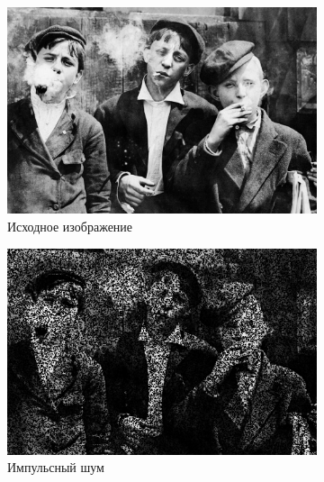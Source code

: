 \begin{figure}[ht] 
    \centering
    \begin{subfigure}[b]{0.5\linewidth}
        \centering
        \includegraphics[width=0.95\linewidth]{../lewis-hine-taschen-main-3.jpg} 
        \caption{Исходное изображение} 
        \label{rang_3_1:a} 
        \vspace{4ex}
    \end{subfigure}%
    \begin{subfigure}[b]{0.5\linewidth}
      \centering
      \includegraphics[width=0.95\linewidth]{../Rang_Filter/Rang_Impulse_noise_(k=3,r=1).jpg} 
      \caption{Импульсный шум} 
      \label{rang_3_1:b} 
      \vspace{4ex}
    \end{subfigure}
    \begin{subfigure}[b]{0.5\linewidth}
      \centering

\end{subfigure}
\end{figure}
